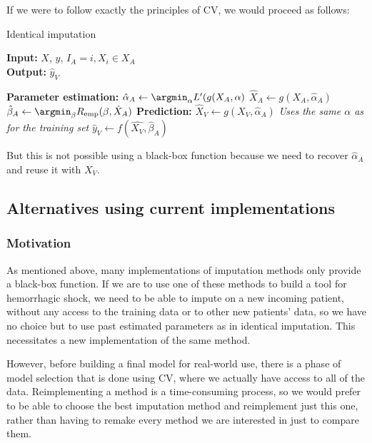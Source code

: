 If we were to follow exactly the principles of CV, we would proceed as follows: 
\begin{algorithm}[H]
	\caption{Identical imputation}
	\hspace*{\algorithmicindent} \textbf{Input:} $X$, $y$, $I_A={i, X_i \in X_A}$  \\
 	\hspace*{\algorithmicindent} \textbf{Output:} $\hat{y}_V$
	\begin{algorithmic}[1]
		\State \textbf{Parameter estimation:}
		\Indstate $\hat{\alpha}_A \leftarrow \argmin_{\alpha} L'(g(X_A,\alpha)$
		\Indstate $\hat{X}_A \leftarrow g(X_A, \hat{\alpha}_A)$
		\Indstate $\hat{\beta}_A \leftarrow \argmin_{\beta} R_{\text{emp}}(\beta,\hat{X}_A)$
		\State \textbf{Prediction:}
		\Indstate $\hat{X}_V \leftarrow g(X_V, \hat{\alpha}_A)$ \Comment \emph{Uses the same $\alpha$ as for the training set}
		\Indstate $\hat{y}_V \leftarrow f(\hat{X_V}, \hat{\beta}_A)$
	\end{algorithmic}
\end{algorithm}

But this is not possible using a black-box function because we need to recover $\hat{\alpha}_A$ and reuse it with $X_V$.

		\subsection{Alternatives using current implementations}
			\subsubsection{Motivation}
As mentioned above, many implementations of imputation methods only provide a black-box function. If we are to use one of these methods to build a tool for hemorrhagic shock, we need to be able to impute on a new incoming patient, without any access to the training data or to other new patients' data, so we have no choice but to use past estimated parameters as in identical imputation. This necessitates a new implementation of the same method.

However, before building a final model for real-world use, there is a phase of model selection that is done using CV, where we actually have access to all of the data. Reimplementing a method is a time-consuming process, so we would prefer to be able to choose the best imputation method and reimplement just this one, rather than having to remake every method we are interested in just to compare them.

